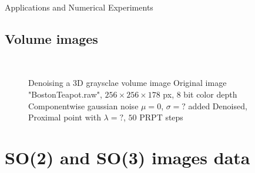 \begin{chapter}{Applications and Numerical Experiments}
\FloatBarrier
\subsection{Volume images} %
\label{sub:Volume images}
\begin{figure}[h!]
    \centering
    \\
    \caption[Denoising 3D Grayscale Volume Data]{Denoising a 3D graysclae volume image
	 Original image "BostonTeapot.raw", $256\times 256 \times 178$ px, 8 bit color depth
	 Componentwise gaussian noise $\mu=0$, $\sigma=?$ added
	 Denoised, Proximal point with $\lambda=?$, $50$ PRPT steps
	\label{fig:application_volume1}
    }
\end{figure}


\FloatBarrier
\section{SO(2) and SO(3) images data} %
\label{sec:SO images data}


\end{chapter}

